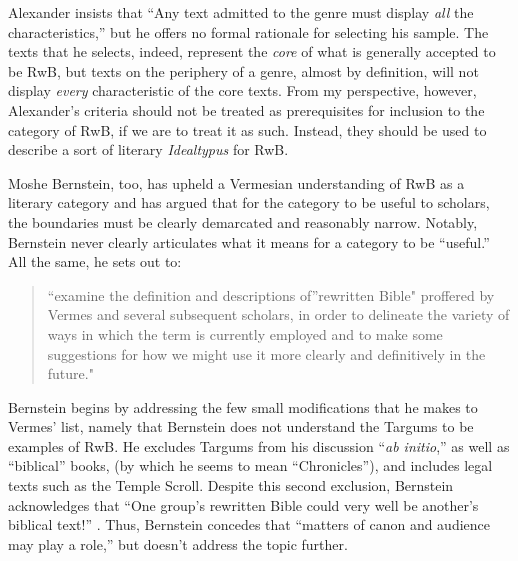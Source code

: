 Alexander insists that ``Any text admitted to the genre must display
\emph{all} the characteristics,''\autocite[119 n.
11]{alexander_carson-williamson1988} but he offers no formal rationale
for selecting his sample. The texts that he selects, indeed, represent
the \emph{core} of what is generally accepted to be RwB, but texts on
the periphery of a genre, almost by definition, will not display
\emph{every} characteristic of the core texts. From my perspective,
however, Alexander's criteria should not be treated as prerequisites for
inclusion to the category of RwB, if we are to treat it as such.
Instead, they should be used to describe a sort of literary
\emph{Idealtypus} for RwB.

Moshe Bernstein, too, has upheld a Vermesian understanding of RwB as a
literary category and has argued that for the category to be useful to
scholars, the boundaries must be clearly demarcated and reasonably
narrow.\autocite{bernstein_textus2005} Notably, Bernstein never clearly
articulates what it means for a category to be ``useful.'' All the same,
he sets out to:

\begin{quote}
``examine the definition and descriptions of''rewritten Bible" proffered
by Vermes and several subsequent scholars, in order to delineate the
variety of ways in which the term is currently employed and to make some
suggestions for how we might use it more clearly and definitively in the
future." \autocite[171--172]{bernstein_textus2005}
\end{quote}

Bernstein begins by addressing the few small modifications that he makes
to Vermes' list, namely that Bernstein does not understand the Targums
to be examples of RwB. He excludes Targums from his discussion
``\emph{ab initio},'' as well as ``biblical'' books, (by which he seems
to mean ``Chronicles''), and includes legal texts such as the Temple
Scroll. Despite this second exclusion, Bernstein acknowledges that ``One
group's rewritten Bible could very well be another's biblical text!''
\autocite[175. This seems particularly odd, since, and Ethiopian
Christian may protest that Jubilees should be excluded as
well.]{bernstein_textus2005}. Thus, Bernstein concedes that ``matters of
canon and audience may play a role,'' but doesn't address the topic
further.

